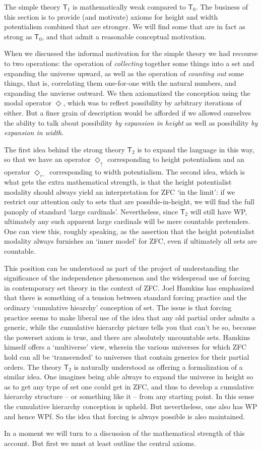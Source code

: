 \documentclass{article}
\newcommand{\du}{\Diamond_\uparrow}
\newcommand{\dl}{\Diamond_\leftarrow}
\begin{document}
The simple theory $\mathsf{T}_1$ is mathematically weak compared to $\mathsf{T}_0$.
The business of this section is to provide (and motivate) axioms for height and width 
potentialism combined that are stronger. We will find some that are in fact 
as strong as $\mathsf{T}_0$, and that admit a reasonable conceptual motivation.

When we discussed the informal motivation for the simple theory we had recourse to 
two operations: the operation of \emph{collecting} together some things into a set and expanding 
the universe upward,
as well as the operation of \emph{counting out} some things, that is, correlating them 
one-for-one with the natural numbers, and expanding the unvierse outward.
We then axiomatized the conception using 
the modal operator $\Diamond$, which was to reflect possibility by arbitrary 
iterations of either. But a finer grain of description would be afforded if we 
allowed ourselves the ability to talk about possibility \emph{by expansion in height}
as well as possibility \emph{by expansion in width}.

The first idea behind the strong theory $\mathsf{T}_2$ is to expand the language in this 
way, so that we have an operator $\du$ corresponding to height potentialism and an operator 
$\dl$ corresponding to width potentialism. The second idea, which is what gets the extra 
mathematical strength, is that the height potentialist modality should always yield 
an interpretation for ZFC `in the limit': if we restrict our attention only to sets 
that are possible-in-height, we will find the full panoply of standard `large cardinals'.
Nevertheless, since $\mathsf{T}_2$ will still have WP, ultimately any such apparent large 
cardinals will be mere countable pretenders. One can view this, roughly speaking, as 
the assertion that the height potentialist modality always furnishes an `inner model' for ZFC, 
even if ultimately all sets are countable. 

This position can be understood as part of the project of understanding the significance of 
the independence phenomenon and the widespread use of forcing in contemporary set theory in 
the context of ZFC. Joel Hamkins has emphasized that there is something of a tension between 
standard forcing practice and the ordinary `cumulative hiearchy' conception of set. The 
issue is that forcing practice seems to make liberal use of the idea that any old partial order 
admits a generic, while the cumulative hierarchy picture tells you that can't be so,
because the powerset axiom is true, and there are absolutely uncountable sets. 
Hamkins himself offers a `multiverse' view, wherein the various universes for which ZFC hold can all be 
`transcended' to universes that contain generics for their partial orders. 
The theory $\mathsf{T}_2$ is naturally understood as offering a formalization of a similar idea. 
One imagines being able always to expand the universe in height so as to get any type of set 
one could get in ZFC, and thus to develop a cumulative hierarchy structure -- or something like it 
-- from any starting point. In this sense the cumulative hierarchy conception is upheld. But nevertheless, 
one also has WP and hence WPf. So the idea that forcing is always possible is also maintained.

In a moment we will turn to a discussion of the mathematical strength of this account. But first 
we must at least outline the central axioms.
\end{document}
